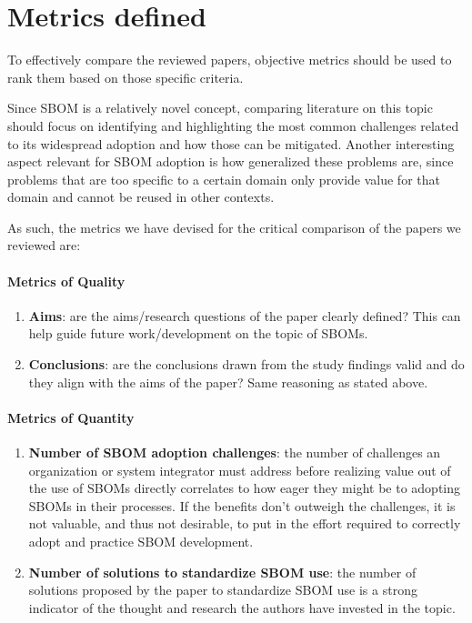 \section{Metrics defined} \label{metrics}

To effectively compare the reviewed papers, objective metrics should be used to rank them based on those specific criteria.

Since SBOM is a relatively novel concept, comparing literature on this topic should focus on identifying and highlighting the most common challenges related to its widespread adoption and how those can be mitigated. Another interesting aspect relevant for SBOM adoption is how generalized these problems are, since problems that are too specific to a certain domain only provide value for that domain and cannot be reused in other contexts.

As such, the metrics we have devised for the critical comparison of the papers we reviewed are:

\paragraph{Metrics of Quality}
\begin{enumerate}
    \item \textbf{Aims}: are the aims/research questions of the paper clearly defined? This can help guide future work/development on the topic of SBOMs.
    \item \textbf{Conclusions}: are the conclusions drawn from the study findings valid and do they align with the aims of the paper? Same reasoning as stated above.
          \setcounter{metrics}{\value{enumi}}
\end{enumerate}

\paragraph{Metrics of Quantity}
\begin{enumerate}
    \setcounter{enumi}{\value{metrics}}
    \item \textbf{Number of SBOM adoption challenges}: the number of challenges an organization or system integrator must address before realizing value out of the use of SBOMs directly correlates to how eager they might be to adopting SBOMs in their processes. If the benefits don't outweigh the challenges, it is not valuable, and thus not desirable, to put in the effort required to correctly adopt and practice SBOM development.
    \item \textbf{Number of solutions to standardize SBOM use}: the number of solutions proposed by the paper to standardize SBOM use is a strong indicator of the thought and research the authors have invested in the topic.
          \setcounter{metrics}{\value{enumi}}
\end{enumerate}

